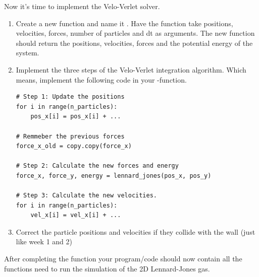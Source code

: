 \documentclass{article}
\begin{document}
Now it's time to implement the Velo-Verlet solver.

\begin{enumerate}[resume]

    \item Create a new function and name it .
        Have the function take positions, velocities, forces, number of particles and dt as arguments.
        The new function should return the positions, velocities, forces and the potential energy of the system.

    \newpage

    \item Implement the three steps of the Velo-Verlet integration algorithm.
        Which means, implement the following code in your -function.

\begin{lstlisting}
# Step 1: Update the positions
for i in range(n_particles):
    pos_x[i] = pos_x[i] + ...

# Remmeber the previous forces
force_x_old = copy.copy(force_x)

# Step 2: Calculate the new forces and energy
force_x, force_y, energy = lennard_jones(pos_x, pos_y)

# Step 3: Calculate the new velocities.
for i in range(n_particles):
    vel_x[i] = vel_x[i] + ...

\end{lstlisting}

    \item Correct the particle positions and velocities if they collide with the wall (just like week 1 and 2)

\end{enumerate}

After completing the  function your program/code should now contain all the functions need to run the simulation of the 2D Lennard-Jones gas.
\end{document}

